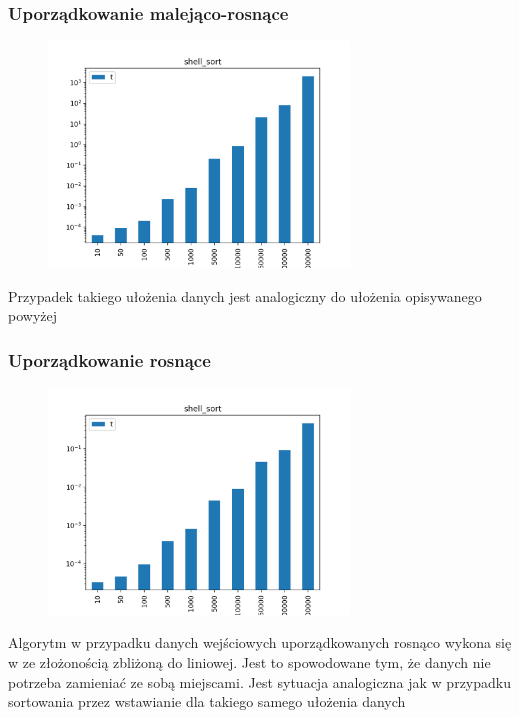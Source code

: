 \documentclass[]{article}
\begin{document}
		\subsubsection{Uporządkowanie malejąco-rosnące}
		\begin{figure}[H]
			\centering
			\includegraphics[width=8cm]{shell_sort_v.png}	
		\end{figure}
		Przypadek takiego ułożenia danych jest analogiczny do ułożenia opisywanego powyżej
		\subsubsection{Uporządkowanie rosnące}
		\begin{figure}[H]
			\centering
			\includegraphics[width=8cm]{shell_sort_g.png}	
		\end{figure}
		Algorytm w przypadku danych wejściowych uporządkowanych rosnąco wykona się w ze złożonością zbliżoną do liniowej. Jest to spowodowane tym, że danych nie potrzeba zamieniać ze sobą miejscami. Jest sytuacja analogiczna jak w przypadku sortowania przez wstawianie dla takiego samego ułożenia danych
\end{document}
